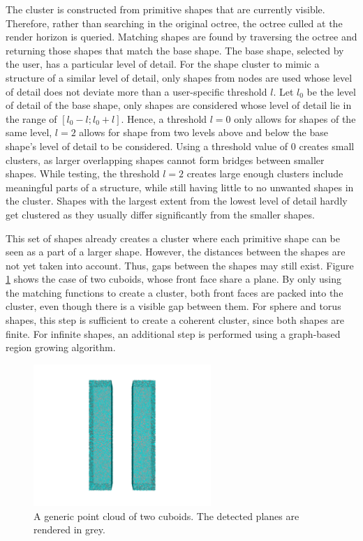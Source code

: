 The cluster is constructed from primitive shapes that are currently visible. Therefore, rather than searching in the original octree, the octree culled at the render horizon is queried. Matching shapes are found by traversing the octree and returning those shapes that match the base shape. The base shape, selected by the user, has a particular level of detail. For the shape cluster to mimic a structure of a similar level of detail, only shapes from nodes are used whose level of detail does not deviate more than a user-specific threshold $l$. Let $l_0$ be the level of detail of the base shape, only shapes are considered whose level of detail lie in the range of $[l_0 - l ; l_0 + l]$. Hence, a threshold $l = 0$ only allows for shapes of the same level, $l = 2$ allows for shape from two levels above and below the base shape's level of detail to be considered. Using a threshold value of 0 creates small clusters, as larger overlapping shapes cannot form bridges between smaller shapes. While testing, the threshold $l = 2$ creates large enough clusters include meaningful parts of a structure, while still having little to no unwanted shapes in the cluster. Shapes with the largest extent from the lowest level of detail hardly get clustered as they usually differ significantly from the smaller shapes. 

\par

This set of shapes already creates a cluster where each primitive shape can be seen as a part of a larger shape. However, the distances between the shapes are not yet taken into account. Thus, gaps between the shapes may still exist. Figure \ref{fig:cuboids} shows the case of two cuboids, whose front face share a plane. By only using the matching functions to create a cluster, both front faces are packed into the cluster, even though there is a visible gap between them.
For sphere and torus shapes, this step is sufficient to create a coherent cluster, since both shapes are finite. For infinite shapes, an additional step is performed using a graph-based region growing algorithm.

\begin{figure}
    \centering
    \includegraphics[width=0.6\textwidth]{Shape_Detection/cuboids.png}
    \caption[Point cloud consisting of two cuboids.]
        {A generic point cloud of two cuboids. The detected planes are rendered in grey.}
    \label{fig:cuboids}
\end{figure}


